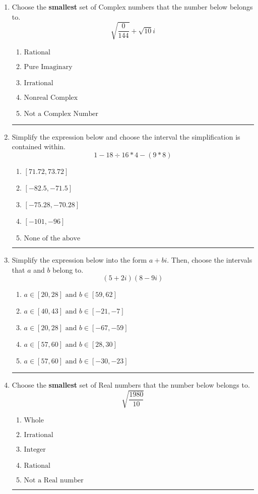 \documentclass[14pt]{extbook}
\newcommand{\litem}[1]{\item#1\hspace*{-1cm}\rule{\textwidth}{0.4pt}}
\begin{document}
\begin{enumerate}
{\begin{enumerate}[label=\Alph*.]
\end{enumerate} }
\litem{
Choose the \textbf{smallest} set of Complex numbers that the number below belongs to.\[ \sqrt{\frac{0}{144}}+\sqrt{10}i \]\begin{enumerate}[label=\Alph*.]
\item \( \text{Rational} \)
\item \( \text{Pure Imaginary} \)
\item \( \text{Irrational} \)
\item \( \text{Nonreal Complex} \)
\item \( \text{Not a Complex Number} \)

\end{enumerate} }
\litem{
Simplify the expression below and choose the interval the simplification is contained within.\[ 1 - 18 \div 16 * 4 - (9 * 8) \]\begin{enumerate}[label=\Alph*.]
\item \( [71.72, 73.72] \)
\item \( [-82.5, -71.5] \)
\item \( [-75.28, -70.28] \)
\item \( [-101, -96] \)
\item \( \text{None of the above} \)

\end{enumerate} }
\litem{
Simplify the expression below into the form $a+bi$. Then, choose the intervals that $a$ and $b$ belong to.\[ (5 + 2 i)(8 - 9 i) \]\begin{enumerate}[label=\Alph*.]
\item \( a \in [20, 28] \text{ and } b \in [59, 62] \)
\item \( a \in [40, 43] \text{ and } b \in [-21, -7] \)
\item \( a \in [20, 28] \text{ and } b \in [-67, -59] \)
\item \( a \in [57, 60] \text{ and } b \in [28, 30] \)
\item \( a \in [57, 60] \text{ and } b \in [-30, -23] \)

\end{enumerate} }
\litem{
Choose the \textbf{smallest} set of Real numbers that the number below belongs to.\[ \sqrt{\frac{1980}{10}} \]\begin{enumerate}[label=\Alph*.]
\item \( \text{Whole} \)
\item \( \text{Irrational} \)
\item \( \text{Integer} \)
\item \( \text{Rational} \)
\item \( \text{Not a Real number} \)


\end{enumerate}}
\end{enumerate}
\end{document}

